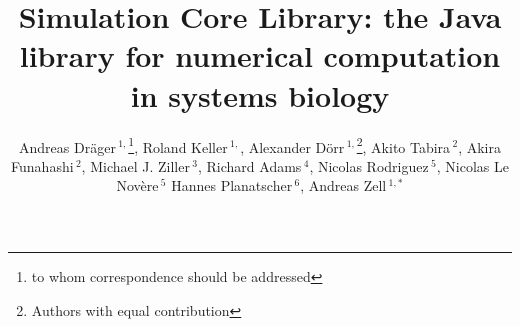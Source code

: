 \documentclass{bioinfo}
\begin{document}

\title[Simulation Core Library]{Simulation Core Library: the Java
library for numerical computation in systems biology} \author[Dr\"ager
\textit{et~al.}]{%
Andreas Dr\"ager\,$^{1,}$\footnote{to whom correspondence should be
addressed}\hspace{.3em},
Roland Keller\,$^{1,}$\dag,
Alexander D\"orr\,$^{1,}$\footnote{Authors with equal
contribution}\hspace{.3em}, Akito Tabira\,$^{2}$,
Akira Funahashi\,$^{2}$,
Michael J. Ziller\,$^{3}$,
Richard Adams\,$^{4}$,
Nicolas Rodriguez\,$^{5}$,
Nicolas Le Nov\`{e}re\,$^{5}$
Hannes Planatscher\,$^{6}$,
Andreas Zell\,$^{1,*}$}
\address{$^{1}$Center for Bioinformatics Tuebingen (ZBIT), University of
Tuebingen, T\"ubingen, Germany,
$^{2}$Keio University, Graduate School of
Science and Technology, Yokohama, Japan, 
$^{3}$Department of Stem Cell and Regenerative Biology, Harvard University,
Cambridge, MA, USA,
$^{5}$University of Edinburgh, Edinburgh, UK,
$^{4}$European Bioinformatics Institute, Wellcome Trust Genome Campus, Hinxton,
Cambridge, UK,
$^{6}$Natural and Medical Science Institute (NMI), University of Tuebingen,
Reutlingen, Germany}



\maketitle
\end{document}
